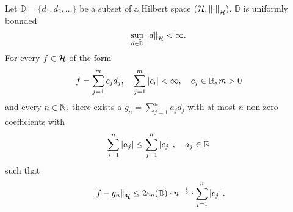 \begin{theorem}
    \label{thm:maurey}
    Let $\mathbb{D} = \{d_1, d_2, \dots\}$ be a subset of a Hilbert space
    $(\mathcal{H}, \left\| \cdot \right\|_{\mathcal{H}})$. $\mathbb{D}$ is uniformly bounded
    \begin{equation}
        \sup_{d\in\mathbb{D}} \left\| d \right\|_{\mathcal{H}} < \infty.
    \end{equation}
    For every $f \in \mathcal{H}$ of the form
    \begin{equation}
        \label{eq:maurey_eq_1}
        f = \sum_{j=1}^m c_j d_j, \quad
        \sum_{j=1}^m \left| c_i \right| < \infty, \quad
        c_j \in \mathbb{R}, m > 0
    \end{equation}
    and every $n \in \mathbb{N}$, there exists a $g_n = \sum_{j=1}^n a_j
    d_j$ with at most $n$ non-zero coefficients with
    \begin{equation}
        \sum_{j=1}^n \left| a_j \right| \leq
        \sum_{j=1}^n \left| c_j \right|, 
        \quad a_j \in \mathbb{R}
    \end{equation}
    such that
    \begin{equation}
        \left\| f - g_n \right\|_{\mathcal{H}} \leq
        2 \varepsilon_{n}({\mathbb{D}})
        \cdot n^{-\frac{1}{2}}
        \cdot \sum_{j=1}^n \left| c_j \right|.
    \end{equation}

\end{theorem}

